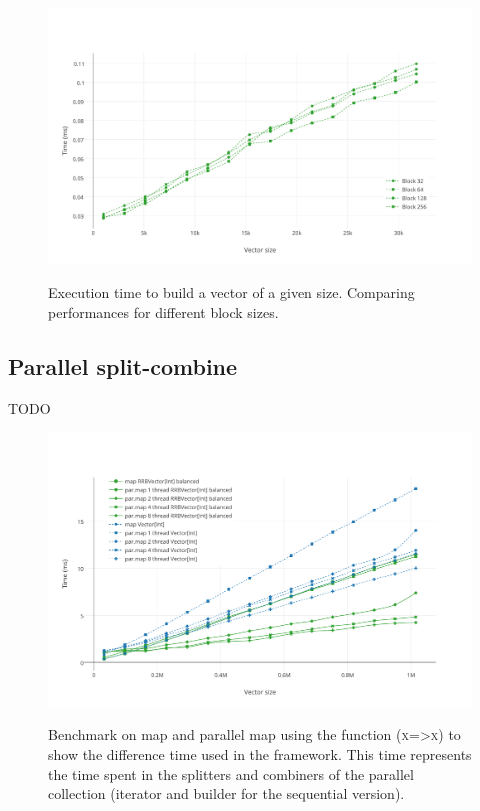 \begin{figure}[h!]
  \centering
  \includegraphics[width=\textwidth]{Benchmarks/Builder_blocks.pdf}
  \label{BuilderBlocksBenchmarks}
  \caption{Execution time to build a vector of a given size. Comparing performances for different block sizes.}
\end{figure}

\subsection{Parallel split-combine}
\color{red} TODO \color{black}

\begin{figure}[h!]
  \centering
  \includegraphics[width=\textwidth]{Benchmarks/Parmap_balanced.pdf}
  \label{ParallelBenchmarks}
  \caption{Benchmark on map and parallel map using the function (\textsc{x=>x}) to show the difference time used in the framework. This time represents the time spent in the splitters and combiners of the parallel collection (iterator and builder for the sequential version).}
\end{figure}

